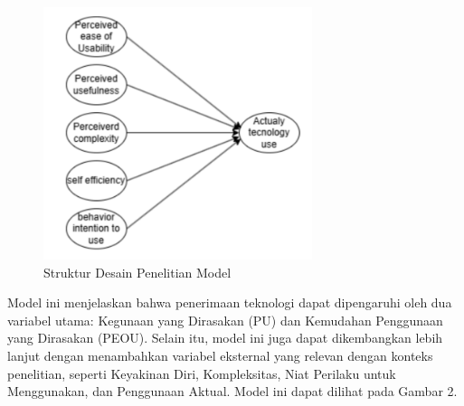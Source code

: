     \begin{figure}[H]
        \centering
        \includegraphics[width=0.7\textwidth]{Gambar/gambar7.4.png}
        \caption{Struktur Desain Penelitian Model}
    \end{figure}

    Model ini menjelaskan bahwa penerimaan teknologi dapat dipengaruhi oleh dua variabel utama: Kegunaan yang Dirasakan (PU) dan Kemudahan Penggunaan yang Dirasakan (PEOU). Selain itu, model ini juga dapat dikembangkan lebih lanjut dengan menambahkan variabel eksternal yang relevan dengan konteks penelitian, seperti Keyakinan Diri, Kompleksitas, Niat Perilaku untuk Menggunakan, dan Penggunaan Aktual. Model ini dapat dilihat pada Gambar 2.

